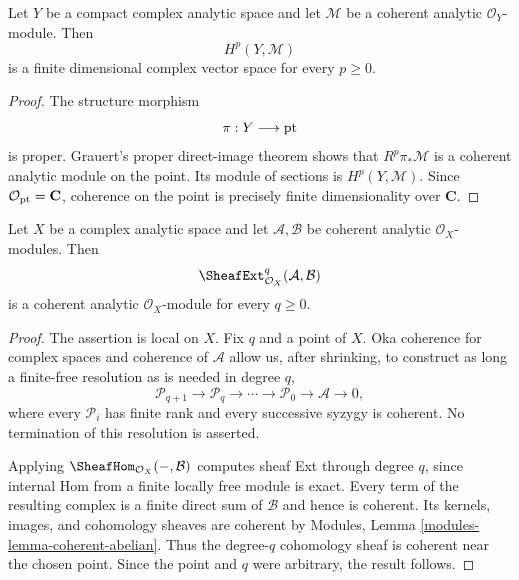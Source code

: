 \begin{lemma}
\label{lemma-compact-complex-analytic-coherent-cohomology-finite-dimensional}
\begin{reference}
\cite[Hauptsatz I, p. 57]{Grauert-direct-image}
\end{reference}
Let $Y$ be a compact complex analytic space and let $\mathcal M$ be a
coherent analytic $\mathcal O_Y$-module. Then
$$
H^p(Y,\mathcal M)
$$
is a finite dimensional complex vector space for every $p\geq 0$.
\end{lemma}

\begin{proof}
The structure morphism
$$
\pi:Y\longrightarrow \mathop{\rm pt}
$$
is proper. Grauert's proper direct-image theorem shows that
$R^p\pi_*\mathcal M$ is a coherent analytic module on the point. Its module
of sections is $H^p(Y,\mathcal M)$. Since
$\mathcal O_{\mathop{\rm pt}}=\mathbf C$, coherence on the point is precisely
finite dimensionality over $\mathbf C$.
\end{proof}

\begin{lemma}
\label{lemma-coherent-analytic-sheaf-ext}
Let $X$ be a complex analytic space and let $\mathcal A,\mathcal B$ be
coherent analytic $\mathcal O_X$-modules. Then
$$
\SheafExt^q_{\mathcal O_X}(\mathcal A,\mathcal B)
$$
is a coherent analytic $\mathcal O_X$-module for every $q\geq 0$.
\end{lemma}

\begin{proof}
The assertion is local on $X$. Fix $q$ and a point of $X$. Oka coherence for
complex spaces and coherence of $\mathcal A$ allow us, after shrinking, to
construct as long a finite-free resolution as is needed in degree $q$,
$$
\mathcal P_{q+1}\longrightarrow\mathcal P_q\longrightarrow\cdots
\longrightarrow\mathcal P_0\longrightarrow\mathcal A\longrightarrow 0,
$$
where every $\mathcal P_i$ has finite rank and every successive syzygy is
coherent. No termination of this resolution is asserted.

Applying $\SheafHom_{\mathcal O_X}(-,\mathcal B)$ computes sheaf Ext through
degree $q$, since internal Hom from a finite locally free module is exact.
Every term of the resulting complex is a finite direct sum of $\mathcal B$
and hence is coherent. Its kernels, images, and cohomology sheaves are
coherent by Modules, Lemma \ref{modules-lemma-coherent-abelian}. Thus the
degree-$q$ cohomology sheaf is coherent near the chosen point. Since the point
and $q$ were arbitrary, the result follows.
\end{proof}

